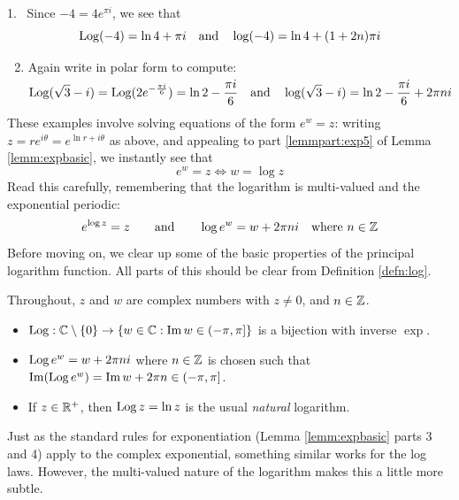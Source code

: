 \begin{examples}{}{}
\hangindent\leftmargini
\textup{1.} \ Since $-4=4e^{\pi i}$, we see that
	\[\operatorname{Log}(-4)=\ln 4+\pi i\quad\text{and}\quad \log(-4)=\ln 4+(1+2n)\pi i\]
\begin{enumerate}\setcounter{enumi}{1}
	\item Again write in polar form to compute:
	\[\operatorname{Log}(\sqrt 3-i)=\operatorname{Log}(2e^{-\frac{\pi i}{6}})=\ln 2-\smash{\frac{\pi i}6}\quad\text{and}\quad \log (\sqrt 3-i)=\ln 2-\smash{\frac{\pi i}6}+2\pi ni\]
\end{enumerate}
\end{examples}

These examples involve solving equations of the form $e^w=z$: writing $z=re^{i\theta}=e^{\ln r+i\theta}$ as above, and appealing to part \ref{lemmpart:exp5} of Lemma \ref*{lemm:expbasic}, we instantly see that
\[e^w=z\iff w=\log z\]
Read this carefully, remembering that the logarithm is multi-valued and the exponential periodic:
\[e^{\log z}=z\qquad\text{and}\qquad\log e^w=w+2\pi ni\quad\text{where $n\in\mathbb{Z}$}\]
Before moving on, we clear up some of the basic properties of the principal logarithm function. All parts of this should be clear from Definition \ref{defn:log}.


\begin{lemm}{}{}
Throughout, $z$ and $w$ are complex numbers with $z\neq 0$, and $n\in\mathbb{Z}$.
\begin{itemize}
  \item $\operatorname{Log}:\mathbb{C}\setminus\{0\}\to \{w\in\mathbb{C}:\operatorname{Im} w\in(-\pi,\pi]\}$ is a bijection with inverse $\exp$.
  \item $\operatorname{Log} e^w=w+2\pi ni$ where $n\in\mathbb{Z}$ is chosen such that $\operatorname{Im}(\operatorname{Log} e^w)=\operatorname{Im} w+2\pi n\in(-\pi,\pi]$.
  \item If $z\in\mathbb{R}^+$, then $\operatorname{Log} z=\ln z$ is the usual \emph{natural} logarithm.
\end{itemize}
\end{lemm}

\label{sec:loglaws}

Just as the standard rules for exponentiation (Lemma \ref{lemm:expbasic} parts 3 and 4) apply to the complex exponential, something similar works for the log laws. However, the multi-valued nature of the logarithm makes this a little more subtle.

